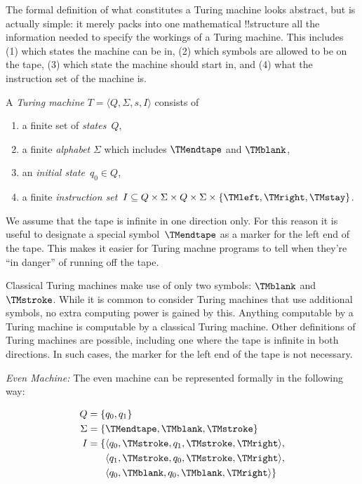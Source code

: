 \documentclass[../../../include/open-logic-section]{subfiles}
\begin{document}

\begin{explain}
The formal definition of what constitutes a Turing machine looks
abstract, but is actually simple: it merely packs into one
mathematical !!{structure} all the information needed to specify the
workings of a Turing machine. This includes (1) which states the
machine can be in, (2) which symbols are allowed to be on the tape, (3)
which state the machine should start in, and (4) what the instruction
set of the machine is.
\end{explain}

\begin{defn}
A \emph{Turing machine} $T = \langle Q, \Sigma, s, I\rangle$ consists of
\begin{enumerate}
\item a finite set of \emph{states}~$Q$,
\item a finite \emph{alphabet} $\Sigma$ which includes $\TMendtape$ and
  $\TMblank$,
\item an \emph{initial state}~$q_0 \in Q$,
\item a finite \emph{instruction set}~$I \subseteq Q \times \Sigma \times Q
  \times \Sigma \times \{\TMleft, \TMright, \TMstay\}$.
\end{enumerate}
\end{defn}

\begin{explain}
We assume that the tape is infinite in one direction only. For this
reason it is useful to designate a special symbol~$\TMendtape$ as
a marker for the left end of the tape. This makes it easier for
Turing machne programs to tell when they're ``in danger'' of running
off the tape. 

Classical Turing machines make use of only two symbols: $\TMblank$ and
$\TMstroke$. While it is common to consider Turing machines that use additional
symbols, no extra computing power is gained by this. Anything computable by
a Turing machine is computable by a classical Turing machine. Other
definitions of Turing machines are possible,
including one where the tape is infinite in both directions. In such cases,
the marker for the left end of the tape is not necessary.
\end{explain}

\begin{ex}
\emph{Even Machine:} The even machine can be represented formally
in the following way:

\begin{align*}
Q = \{ & q_0, q_1 \} \\
\Sigma = \{ & \TMendtape, \TMblank, \TMstroke \} \\
I = \{ & \langle q_0, \TMstroke, q_1, \TMstroke, \TMright \rangle,\\
&\langle q_1, \TMstroke, q_0, \TMstroke, \TMright \rangle,\\
& \langle q_0, \TMblank, q_0, \TMblank, \TMright \rangle \}
\end{align*}
\end{ex}
\end{document}
